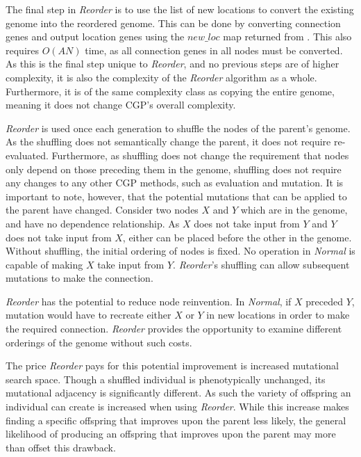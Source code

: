 \documentclass[journal]{IEEEtran}
\begin{document}
The final step in \emph{Reorder} is to use the list of new locations to convert
the existing genome into the reordered genome.  This can be done
by converting connection genes and output location genes using
the $new\_loc$ map returned from .
This also requires $O(AN)$ time, as all connection genes in all nodes must
be converted.  As this is the final step unique to \emph{Reorder}, and
no previous steps are of higher complexity, it is also the complexity of
the \emph{Reorder} algorithm as a whole.  Furthermore, it is of the same complexity class
as copying the entire genome, meaning it does not change CGP's overall complexity.

\emph{Reorder} is used once each generation to shuffle the nodes of the parent's
genome.  As the shuffling does not semantically change the parent, it does
not require re-evaluated.  Furthermore, as shuffling does not change the requirement
that nodes only depend on those preceding them in the genome, shuffling does not
require any changes to any other CGP methods, such as evaluation and mutation.
It is important to note, however, that the potential mutations that can be applied to the parent
have changed.  Consider two nodes $X$ and $Y$ which are in the genome, and
have no dependence relationship.  As $X$ does not take input from $Y$ and
$Y$ does not take input from $X$, either can be placed before the other
in the genome.  Without shuffling, the initial ordering of nodes is fixed.
No operation in \emph{Normal} is capable of making $X$
take input from $Y$.  \emph{Reorder}'s shuffling can allow
subsequent mutations to make the connection.

\emph{Reorder} has the potential to reduce node reinvention.  In \emph{Normal}, if
$X$ preceded $Y$, mutation would have to recreate either $X$ or $Y$ in new locations
in order to make the required connection.  \emph{Reorder} provides the opportunity
to examine different orderings of the genome without such costs.

The price \emph{Reorder} pays for this potential improvement is increased mutational search
space.  Though a shuffled individual is phenotypically unchanged,
its mutational adjacency is significantly different.  As such the variety of offspring
an individual can create is increased when using \emph{Reorder}.  While this increase
makes finding a specific offspring that improves upon the parent less likely, the
general likelihood of producing an offspring that improves upon the parent may 
more than offset this drawback.
\end{document}
